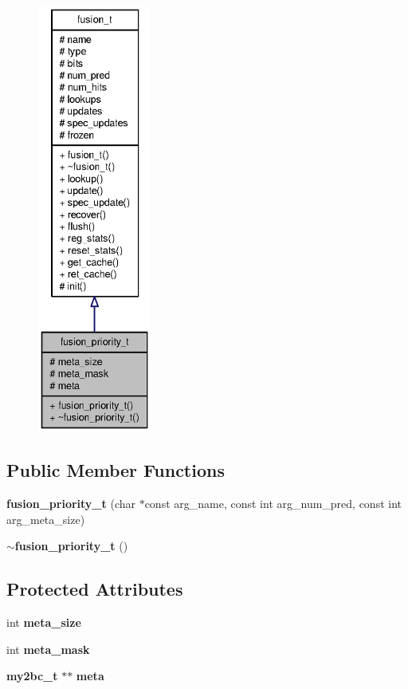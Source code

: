 \begin{figure}[H]
\begin{center}
\leavevmode
\includegraphics[height=400pt]{classfusion__priority__t__coll__graph}
\end{center}
\end{figure}
\subsection*{Public Member Functions}
\begin{CompactItemize}
\item 
{\bf fusion\_\-priority\_\-t} (char $\ast$const arg\_\-name, const int arg\_\-num\_\-pred, const int arg\_\-meta\_\-size)
\item 
{\bf $\sim$fusion\_\-priority\_\-t} ()
\end{CompactItemize}
\subsection*{Protected Attributes}
\begin{CompactItemize}
\item 
int {\bf meta\_\-size}
\item 
int {\bf meta\_\-mask}
\item 
{\bf my2bc\_\-t} $\ast$$\ast$ {\bf meta}
\end{CompactItemize}


